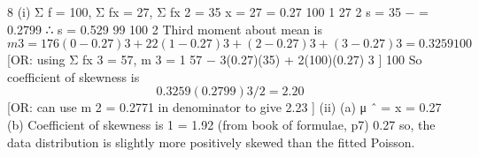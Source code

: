 \documentclass[a4paper,12pt]{article}
\begin{document}
8
(i)
Σ f = 100, Σ fx = 27, Σ fx 2 = 35
x =
27
= 0.27
100
1
27 2
s = {35 −
} = 0.2799 ∴ s = 0.529
99
100
2
Third moment about mean is
\[m 3 =
1
{76(0 − 0.27) 3 + 22(1 − 0.27) 3 + (2 − 0.27) 3 + (3 − 0.27) 3 } = 0.3259
100\]
[OR: using Σ fx 3 = 57, m 3 =
1
{57 − 3(0.27)(35) + 2(100)(0.27) 3 } ]
100
So coefficient of skewness is
\[0.3259
(0.2799) 3/2
= 2.20\]
[OR: can use m 2 = 0.2771 in denominator to give 2.23 ]
(ii)
(a) μ ˆ = x = 0.27
(b) Coefficient of skewness is
1
= 1.92 (from book of formulae, p7)
0.27
so, the data distribution is slightly more positively skewed than the fitted Poisson.

\end{document}
